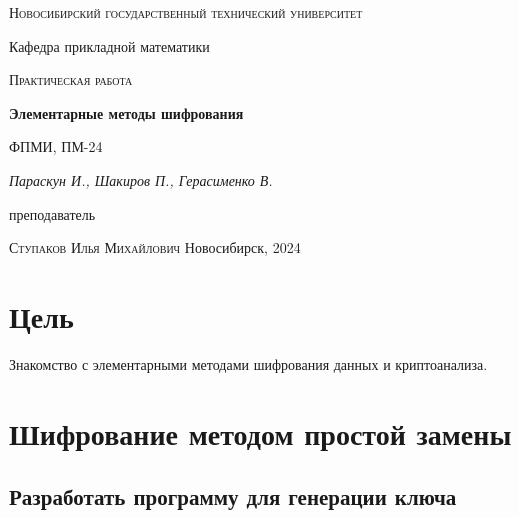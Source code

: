 \documentclass[12pt, a4paper]{article}
\begin{document}
\begin{titlepage}
  \centering
  \textsc{Новосибирский государственный технический университет}\par
  \vspace{1mm}
  Кафедра прикладной математики\par
  \vspace{4cm}
  \textsc{Практическая работа }\par
  {\huge\bfseries Элементарные методы шифрования\par}
  \vspace{1cm}
  {\scriptsize ФПМИ, ПМ-24\par}
  \vspace{1mm}
  {\itshape\large Параскун И., Шакиров П., Герасименко В.\par}
  \vfill
  {\small преподаватель\par}
  \vspace{1mm}
  \textsc{Ступаков Илья Михайлович}
  \vfill
  \large{Новосибирск, 2024}
\end{titlepage}

\newpage

\section{Цель}
Знакомство с элементарными методами шифрования данных и криптоанализа.

\section{Шифрование методом простой замены}
\subsection{Разработать программу для генерации ключа}
\end{document}
